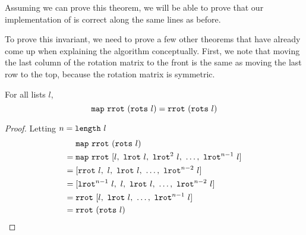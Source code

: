\documentclass[sigplan,10pt,anonymous,review]{thesis}
\begin{document}
Assuming we can prove this theorem, we will be able to prove that our
implementation of  is correct along the same lines as before.

To prove this invariant, we need to prove a few other theorems that
have already come up when explaining the algorithm conceptually.
First, we note that moving the last column of the rotation matrix to the front
is the same as moving the last row to the top, because the rotation
matrix is symmetric.

\begin{theorem}
  For all lists $l$,
  \begin{equation*}
    \texttt{map}~\texttt{rrot}~(\texttt{rots}~l) = \texttt{rrot}~(\texttt{rots}~l)
  \end{equation*}
\end{theorem}
\begin{proof}
  Letting $n = \texttt{length}~l$
  \begin{align*}
       &\texttt{map}~\texttt{rrot}~(\texttt{rots}~l) \\
    ={}&\texttt{map}~\texttt{rrot}~[l,~\texttt{lrot}~l,~\texttt{lrot}^2~l,~\ldots,~\texttt{lrot}^{n-1}~l] \\
    ={}&[\texttt{rrot}~l,~l,~\texttt{lrot}~l,~\ldots,~\texttt{lrot}^{n-2}~l] \\
    ={}&[\texttt{lrot}^{n-1}~l,~l,~\texttt{lrot}~l,~\ldots,~\texttt{lrot}^{n-2}~l] \\
    ={}&\texttt{rrot}~[l,~\texttt{lrot}~l,~\ldots,~\texttt{lrot}^{n-1}~l] \\
    ={}&\texttt{rrot}~(\texttt{rots}~l) \qedhere
  \end{align*}
\end{proof}
\end{document}
